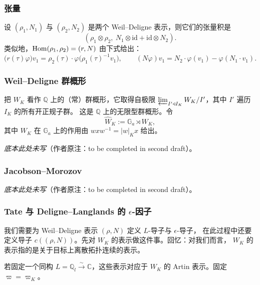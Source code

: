 \subsubsection{张量}

设 $(\rho_1,N_1)$ 与 $(\rho_2,N_2)$ 是两个 Weil--Deligne 表示，则它们的张量积是
\[
(\rho_1\otimes\rho_2,\ N_1\otimes\mathrm{id}+\mathrm{id}\otimes N_2).
\]
类似地，$\mathrm{Hom}(\rho_1,\rho_2)=(r,N)$ 由下式给出：
\[
\bigl(r(\tau)\varphi\bigr)v_1=\rho_2(\tau)\cdot\varphi\bigl(\rho_1(\tau)^{-1}v_1\bigr),
\qquad
(N\varphi)v_1=N_2\cdot\varphi(v_1)-\varphi(N_1\cdot v_1).
\]

\subsubsection{Weil--Deligne 群概形}

把 $W_K$ 看作 $\mathbb{Q}$ 上的（常）群概形，它取得自极限
$\varprojlim_{I'\triangleleft I_K}W_K/I'$，其中 $I'$ 遍历 $I_K$ 的所有开正规子群。
这是 $\mathbb{Q}$ 上的无限型群概形。令
\[
\widehat{W}_K:=\mathbb{G}_a\rtimes W_K ,
\]
其中 $W_K$ 在 $\mathbb{G}_a$ 上的作用由 $wxw^{-1}=|w|_K x$ 给出。

\begin{center}
\emph{底本此处未写}（作者原注：to be completed in second draft）。
\end{center}

\subsubsection{Jacobson--Morozov}

\begin{center}
\emph{底本此处未写}（作者原注：to be completed in second draft）。
\end{center}

\subsubsection{Tate 与 Deligne--Langlands 的 $\epsilon$-因子}

我们需要为 Weil--Deligne 表示 $(\rho,N)$ 定义 $L$-导子与 $\epsilon$-导子，
在此过程中还要定义导子 $c((\rho,N))$。先对 $W_K$ 的表示做这件事。回忆：对我们而言，
$W_K$ 的表示指的是关于目标上离散拓扑连续的表示。

若固定一个同构 $L=\mathbb{Q}_l\xrightarrow{\ \sim\ }\mathbb{C}$，这些表示对应于
$W_K$ 的 Artin 表示。固定 $\varpi=\varpi_K$。


